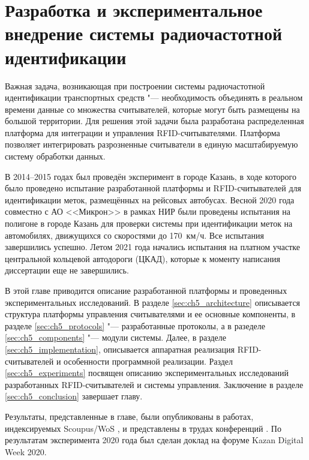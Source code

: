 \chapter{Разработка и экспериментальное внедрение системы радиочастотной идентификации}\label{ch:ch5}
Важная задача, возникающая при построении системы радиочастотной идентификации транспортных средств "--- необходимость объединять в реальном времени данные со множества считывателей, которые могут быть размещены на большой территории. Для решения этой задачи была разработана распределенная платформа для интеграции и управления RFID-считывателями. Платформа позволяет интегрировать разрозненные считыватели в единую масштабируемую систему обработки данных.

В 2014--2015 годах был проведён эксперимент в городе Казань, в ходе которого было проведено испытание разработанной платформы и RFID-считывателей для идентификации меток, размещённых на рейсовых автобусах. Весной 2020 года совместно с АО <<Микрон>> в рамках НИР были проведены испытания на полигоне в городе Казань для проверки системы при идентификации меток на автомобилях, движущихся со скоростями до 170~км/ч. Все испытания завершились успешно. Летом 2021 года начались испытания на платном участке центральной кольцевой автодороги (ЦКАД), которые к моменту написания диссертации еще не завершились.

В этой главе приводится описание разработанной платформы и проведенных экспериментальных исследований. В разделе \ref{sec:ch5_architecture} описывается структура платформы управления считывателями и ее основные компоненты, в разделе \ref{sec:ch5_protocols} "--- разработанные протоколы, а в разеделе \ref{sec:ch5_components} "--- модули системы. Далее, в разделе \ref{sec:ch5_implementation}, описывается аппаратная реализация RFID-считывателей и особенности программной реализации. Раздел \ref{sec:ch5_experiments} посвящен описанию экспериментальных исследований разработанных RFID-считывателей и системы управления. Заключение в разделе \ref{sec:ch5_conclusion} завершает главу.

Результаты, представленные в главе, были опубликованы в работах, индексируемых Scoupus/WoS \cite{RFIDCTRL_NETS2CARS2014, RFIDTA2012}, и представлены в трудах конференций \cite{RFIDCTRL_DCCN2017, RFIDCTRL_VSPU2014}. По результатам эксперимента 2020 года был сделан доклад на форуме Kazan Digital Week 2020.



